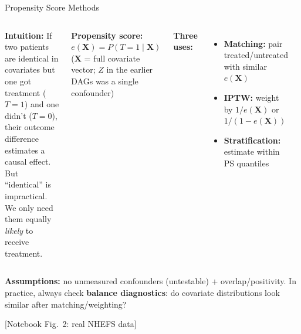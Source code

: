 \documentclass[aspectratio=169,10pt]{beamer}
\begin{document}
\begin{frame}{Propensity Score Methods}
\begin{columns}[T]
\textbf{Intuition:} If two patients are identical in covariates but one got treatment ($T{=}1$) and one didn't ($T{=}0$), their outcome difference estimates a causal effect. But ``identical'' is impractical. We only need them equally \emph{likely} to receive treatment.

\vspace{0.3em}
\textbf{Propensity score:} $e(\mathbf{X}) = P(T{=}1 \mid \mathbf{X})$\\
{\scriptsize ($\mathbf{X}$ = full covariate vector; $Z$ in the earlier DAGs was a single confounder)}

\vspace{0.2em}
\textbf{Three uses:}
\begin{itemize}
    \item \textbf{Matching:} pair treated/untreated with similar $e(\mathbf{X})$
    \item \textbf{IPTW:} weight by $1/e(\mathbf{X})$ or $1/(1{-}e(\mathbf{X}))$
    \item \textbf{Stratification:} estimate within PS quantiles
\end{itemize}

\begin{center}
\end{center}
\end{columns}

\vspace{0.2em}
{\small \textbf{Assumptions:} no unmeasured confounders (untestable) + overlap/positivity. In practice, always check \textbf{balance diagnostics}: do covariate distributions look similar after matching/weighting?}

{\small [Notebook Fig.~2: real NHEFS data]}
\end{frame}
\end{document}
